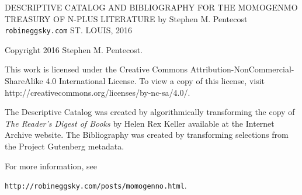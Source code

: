 \documentclass{book}
\begin{document}
{\fontsize{12pt}{14pt}\selectfont
\newpage
\null

\newpage
\begin{center}
\vspace*{5mm}
{\Huge
DESCRIPTIVE CATALOG
\linebreak
\linebreak
AND
\linebreak
\linebreak
BIBLIOGRAPHY
\linebreak
\linebreak
FOR THE
\linebreak
\linebreak
MOMOGENMO TREASURY
\linebreak
\linebreak
OF
\linebreak
\linebreak
N-PLUS LITERATURE
\linebreak
\linebreak
}
{\Large
\linebreak
\linebreak
\linebreak
by
\linebreak
\linebreak
\linebreak
}
{\huge
Stephen M. Pentecost
}
\linebreak
\linebreak
\linebreak
\linebreak
\linebreak
\linebreak
\linebreak
\linebreak
{\LARGE 
\texttt{robineggsky.com}
}
\linebreak
\linebreak
{\Large 
ST. LOUIS, 2016
}
\end{center}

\newpage
\vspace*{1.0in}
Copyright 2016 Stephen M. Pentecost.
\bigbreak
\bigbreak
\bigbreak
\par
This work is licensed under the Creative Commons Attribution-NonCommercial-ShareAlike 4.0 International License. To view a copy of this license, visit http://creativecommons.org/licenses/by-nc-sa/4.0/.
\bigbreak
\par
The Descriptive Catalog was created by algorithmically transforming the copy of \textit{The Reader's Digest of Books} by Helen Rex Keller available at the Internet Archive website.  The Bibliography was created by transforming selections from the Project Gutenberg metadata.
\bigbreak
\par
For more information, see
\par
\vspace*{0.10in}
\texttt{http://robineggsky.com/posts/momogenno.html}.
\par

}
\end{document}
